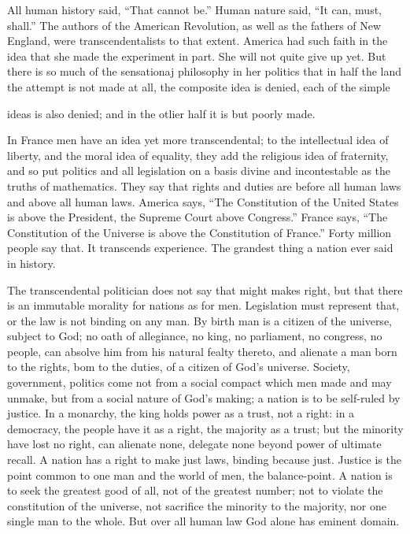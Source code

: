 \documentclass[12pt]{article}
\begin{document}
All human history said, ``That cannot be.'' Human 
nature said, ``It can, must, shall.'' The authors of 
the American Revolution, as well as the fathers of New 
England, were transcendentalists to that extent. 
America had such faith in the idea that she made the 
experiment in part. She will not quite give up yet. But 
there is so much of the sensationaj philosophy in her 
politics that in half the land the attempt is not made 
at all, the composite idea is denied, each of the simple 




ideas is also denied; and in the otlier half it is but 
poorly made. 

In France men have an idea yet more transcendental; 
to the intellectual idea of liberty, and the moral idea of 
equality, they add the religious idea of fraternity, and 
so put politics and all legislation on a basis divine and 
incontestable as the truths of mathematics. They say 
that rights and duties are before all human laws and 
above all human laws. America says, ``The Constitution of the United States is above the President, the 
Supreme Court above Congress.'' France says, ``The 
Constitution of the Universe is above the Constitution 
of France.'' Forty million people say that. It transcends experience. The grandest thing a nation ever 
said in history. 

The transcendental politician does not say that might 
makes right, but that there is an immutable morality 
for nations as for men. Legislation must represent 
that, or the law is not binding on any man. By birth 
man is a citizen of the universe, subject to God; no 
oath of allegiance, no king, no parliament, no congress, 
no people, can absolve him from his natural fealty 
thereto, and alienate a man born to the rights, bom to 
the duties, of a citizen of God's universe. Society, government, politics come not from a social compact which 
men made and may unmake, but from a social nature 
of God's making; a nation is to be self-ruled by justice. In a monarchy, the king holds power as a trust, 
not a right: in a democracy, the people have it as a 
right, the majority as a trust; but the minority have 
lost no right, can alienate none, delegate none beyond 
power of ultimate recall. A nation has a right to make 
just laws, binding because just. Justice is the point 
common to one man and the world of men, the balance-point. A nation is to seek the greatest good of all, not 
of the greatest number; not to violate the constitution 
of the universe, not sacrifice the minority to the majority, nor one single man to the whole. But over all human law God alone has eminent domain. 
\end{document}
